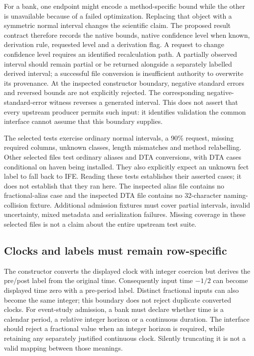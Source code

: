 For a bank, one endpoint might encode a method-specific bound while the other is unavailable because of a failed optimization. Replacing that object with a symmetric normal interval changes the scientific claim. The proposed result contract therefore records the native bounds, native confidence level when known, derivation rule, requested level and a derivation flag. A request to change confidence level requires an identified recalculation path. A partially observed interval should remain partial or be returned alongside a separately labelled derived interval; a successful file conversion is insufficient authority to overwrite its provenance. At the inspected constructor boundary, negative standard errors and reversed bounds are not explicitly rejected. The corresponding negative-standard-error witness reverses a generated interval. This does not assert that every upstream producer permits such input: it identifies validation the common interface cannot assume that this boundary supplies.\citep{exec29_panel_inference_sources,exec29_panel_inference_reference}

The selected tests exercise ordinary normal intervals, a 90\% request, missing required columns, unknown classes, length mismatches and method relabelling. Other selected files test ordinary aliases and DTA conversions, with DTA cases conditional on haven being installed. They also explicitly expect an unknown fect label to fall back to IFE. Reading these tests establishes their asserted cases; it does not establish that they ran here. The inspected alias file contains no fractional-alias case and the inspected DTA file contains no 32-character naming-collision fixture. Additional admission fixtures must cover partial intervals, invalid uncertainty, mixed metadata and serialization failures. Missing coverage in these selected files is not a claim about the entire upstream test suite.\citep{exec29_panel_inference_sources}

\subsection{Clocks and labels must remain row-specific}

The constructor converts the displayed clock with integer coercion but derives the pre/post label from the original time. Consequently input time $-1/2$ can become displayed time zero with a pre-period label. Distinct fractional inputs can also become the same integer; this boundary does not reject duplicate converted clocks. For event-study admission, a bank must declare whether time is a calendar period, a relative integer horizon or a continuous duration. The interface should reject a fractional value when an integer horizon is required, while retaining any separately justified continuous clock. Silently truncating it is not a valid mapping between those meanings.\citep{exec29_panel_inference_sources,exec29_panel_inference_reference}

